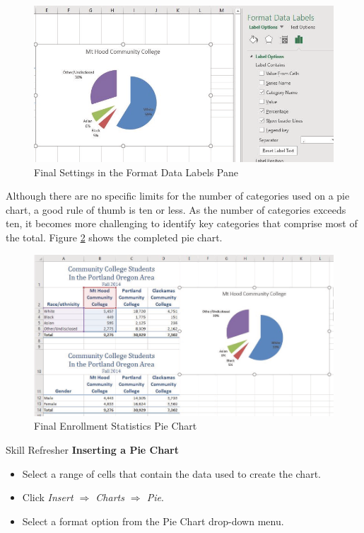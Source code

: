 \begin{figure}[H]
	\centering
	\includegraphics[width=\maxwidth{.95\linewidth}]{gfx/ch04_fig22}
	\caption{Final Settings in the Format Data Labels Pane}
	\label{04:fig22}
\end{figure}

Although there are no specific limits for the number of categories used on a pie chart, a good rule of thumb is ten or less. As the number of  categories exceeds ten, it becomes more challenging to identify key categories that comprise most of the total. Figure \ref{04:fig23} shows the completed pie chart.

\begin{figure}[H]
	\centering
	\includegraphics[width=\maxwidth{.95\linewidth}]{gfx/ch04_fig23}
	\caption{Final Enrollment Statistics Pie Chart}
	\label{04:fig23}
\end{figure}

\begin{center}
	\begin{sklbox}{Skill Refresher}
		\textbf{Inserting a Pie Chart}
		\\
		\begin{itemize}
			\setlength{\itemsep}{0pt}
			\setlength{\parskip}{0pt}
			\setlength{\parsep}{0pt}

			\item Select a range of cells that contain the data used to create the chart.
			\item Click \textit{Insert $ \Rightarrow $ Charts $ \Rightarrow $ Pie}.
			\item Select a format option from the Pie Chart drop-down menu.
			
		\end{itemize}
	\end{sklbox}
\end{center}

